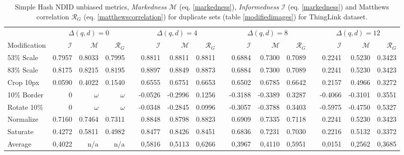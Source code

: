 \documentclass[english,12pt,a4paper,pdftex,elec,utf8, table]{aaltothesis}
\begin{document}
\begin{table}\footnotesize
\caption{ Simple Hash NDID unbiased metrics, \emph{Markedness} $\mathcal{M}$ (eq. \ref{markedness}), \emph{Informedness} $\mathcal{I}$ (eq. \ref{markedness}) and Matthews correlation $\mathcal{R}_G$ (eq. \ref{matthewscorrelation}) for duplicate sets (table \ref{modifiedimages}) for ThingLink dataset. }
\label{simplethinglinkunbiased}
\begin{center}
  \setlength\tabcolsep{3pt} %
  \begin{tabular}{@{}lrrrrrrrrrrrrrrr@{}}
    \toprule
    & \multicolumn{3}{c}{$\Delta(q,d) = 0$} &\phantom{abc} &\multicolumn{3}{c}{$\Delta(q,d) = 4$} &\phantom{abc} & \multicolumn{3}{c}{$\Delta(q,d)=8$} &\phantom{abc} & \multicolumn{3}{c}{$\Delta(q,d)=12$}\\
\cmidrule{2-4} \cmidrule{6-8} \cmidrule{10-12} \cmidrule{14-16}
    Modification & $\mathcal{I}$ & $\mathcal{M}$ & $\mathcal{R}_G$ &\phantom{abc} & $\mathcal{I}$ & $\mathcal{M}$ & $\mathcal{R}_G$ &\phantom{abc} & $\mathcal{I}$ & $\mathcal{M}$ & $\mathcal{R}_G$ &\phantom{abc} & $\mathcal{I}$ & $\mathcal{M}$ & $\mathcal{R}_G$\\ \midrule
    53\% Scale   & 0.7957 & 0.8033 & 0.7995 &\phantom{abc} & 0.8811 & 0.8811 & 0.8811 &\phantom{abc} & 0.6884 & 0.7300 & 0.7089  &\phantom{abc} & 0.2241 & 0.5230 & 0.3423\\
    83\% Scale   & 0.8175 & 0.8215 & 0.8195&\phantom{abc} & 0.8897 & 0.8849 & 0.8873 &\phantom{abc} & 0.6884 & 0.7300  & 0.7089 &\phantom{abc} & 0.2241 & 0.5230 & 0.3423\\
    Crop 10px    & 0.0590 & 0.4022 & 0.1540 &\phantom{abc} & 0.6555 & 0.6751 & 0.6653 &\phantom{abc} & 0.6502 & 0.6785 & 0.6642 &\phantom{abc} & 0.2157 & 0.4966 & 0.3272 \\
    10\% Border  & 0 & $\omega$ & $\omega$ & \phantom{abc} & -0.0526 & -0.2996 & 0.1256 &\phantom{abc} & -0.3188 & -0.3389 & 0.3287 &\phantom{abc} & -0.4066 & -0.3101 & 0.3551\\
    Rotate 10\%  & 0 & $\omega$ &  $\omega$ &\phantom{abc} & -0.0348 & -0.2845 & 0.0996 &\phantom{abc} & -0.3057 & -0.3788  & 0.3403 &\phantom{abc} & -0.5975 & -0.4750& 0.5327\\
    Normalize    & 0.7160 & 0.7464 & 0.7311 &\phantom{abc} & 0.8848 & 0.8798 & 0.8823 &\phantom{abc} & 0.6909 & 0.7335 & 0.7118  &\phantom{abc} & 0.2241 & 0.5230 & 0.3423 \\
    Saturate     & 0.4272& 0.5811& 0.4982 &\phantom{abc} & 0.8477 & 0.8426 & 0.8451 &\phantom{abc} & 0.6836  & 0.7231 & 0.7030 &\phantom{abc} & 0.2216 & 0.5132 & 0.3372\\
    \bottomrule
    Average      & 0,4022 & n/a & n/a & \phantom{abc} & \cellcolor{blue!25}0,5816& 0,5113 & 0,6266 & \phantom{abc} & 0,3967& 0,4110& 0,5951 &\phantom{abc} & 0,0151& 0,2562 & 0,3685\\
\end{tabular}
\end{center}
\end{table}
\end{document}

